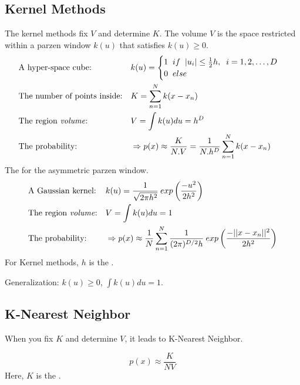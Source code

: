 \subsection{Kernel Methods}
The kernel methods fix $V$ and determine $K$. The volume $V$ is the space restricted within a parzen window $k(u)$ that satisfies $k(u) \geq 0$.
\begin{align}
	&\text{A hyper-space cube:} && k(u) = \begin{cases}
		1\;\; if \;\; |u_i| \leq \frac{1}{2}h, \;\; i = 1, 2, \dots, D \\
		0\;\; else
	\end{cases} \\
	&\text{The number of points inside:} &&K = \sum_{n=1}^{N} k(x-x_n) \\
	&\text{The region \textit{volume}:} &&V = \int k(u) du = h^D\\
	&\text{The probability:} && \Rightarrow p(x) \approx \frac{K}{N.V} = \frac{1}{N.h^D}\sum_{n=1}^{N}k(x-x_n)
\end{align}
The  for the asymmetric parzen window.
\begin{align}
	&\text{A Gaussian kernel:} && k(u) = \frac{1}{\sqrt{2\pi h^2}}\:exp\left(\frac{-u^2}{2h^2}\right) \\
	&\text{The region \textit{volume}:} &&V = \int k(u) du = 1 \\
	&\text{The probability:} && \Rightarrow p(x) \approx \frac{1}{N} \sum_{n=1}^{N} \frac{1}{(2\pi)^{D/2}h}\:exp\left(\frac{-||x-x_n||^2}{2h^2}\right)
\end{align}
For Kernel methods, $h$ is the .

Generalization: $k(u) \geq 0$, $\displaystyle \int k(u)du = 1$.


\subsection{K-Nearest Neighbor}
When you fix $K$ and determine $V$, it leads to K-Nearest Neighbor.


\begin{equation}
	p(x) \approx \frac{K}{NV}
\end{equation}
Here, $K$ is the .


